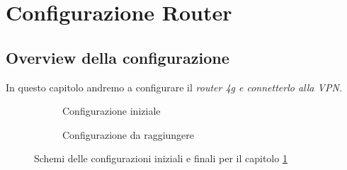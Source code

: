 
\chapter{Configurazione Router}
\label{ch:configurazione-router}

\section{Overview della configurazione}

In questo capitolo andremo a configurare il \it{router 4g} e connetterlo alla VPN.


\newsavebox{\myimagea}
\begin{figure}[H]
    \centering%
    \begin{subfigure}{0.4\textwidth}
        \centering
        \usebox{\myimagea}
        \caption{Configurazione iniziale}
        \label{fig:diag-router}
    \end{subfigure}
    \hfill%
    \begin{subfigure}{0.5\textwidth}
        \centering
        \caption{Configurazione da raggiungere}
        \label{fig:diag-router1}
    \end{subfigure}
    \caption{Schemi delle configurazioni iniziali e finali per il capitolo \ref{ch:configurazione-router}}
\end{figure}


